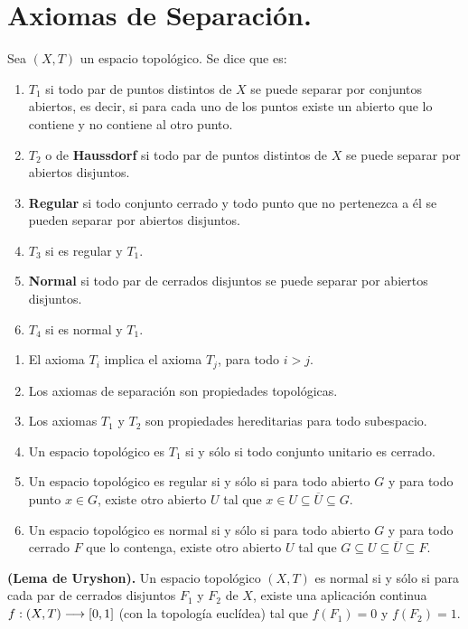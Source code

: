 \documentclass[cursovd_portada.tex]{subfiles}
\begin{document}
\section{Axiomas de Separación.}
\begin{defi}
Sea $(X,T)$ un espacio topológico. Se dice que es:
\begin{enumerate}
\item $T_1$ si todo par de puntos distintos de $X$ se puede separar por conjuntos abiertos, es decir, si para cada
uno de los puntos existe un abierto que lo contiene y no contiene al otro punto.
\item $T_2$ o de {\bf Haussdorf} si todo par de puntos distintos de $X$ se puede separar por abiertos disjuntos.
\item {\bf Regular} si todo conjunto cerrado y todo punto que no pertenezca a él se pueden separar por abiertos
disjuntos.
\item $T_3$ si es regular y $T_1$.
\item {\bf Normal} si todo par de cerrados disjuntos se puede separar por abiertos disjuntos.
\item $T_4$ si es normal y $T_1$.
\end{enumerate}
\end{defi}
\begin{prop}
\begin{enumerate}
\item El axioma $T_i$ implica el axioma $T_j$, para todo $i>j$.
\item Los axiomas de separación son propiedades topológicas.
\item Los axiomas $T_1$ y $T_2$ son propiedades hereditarias para todo subespacio.
\item Un espacio topológico es $T_1$ si y sólo si todo conjunto unitario es cerrado.
\item Un espacio topológico es regular si y sólo si para todo abierto $G$ y para todo punto $x\in G$,
existe otro abierto $U$ tal que $x\in U\subseteq\overline{U}\subseteq G$.
\item Un espacio topológico es normal si y sólo si para todo abierto $G$ y para todo cerrado $F$ que lo contenga,
existe otro abierto $U$ tal que $G\subseteq U\subseteq\overline{U}\subseteq F$.
\end{enumerate}
\end{prop}
\begin{teorema}
{\bf (Lema de Uryshon).} Un espacio topológico $(X,T)$ es normal si y sólo si para cada par de cerrados disjuntos
$F_1$ y $F_2$ de $X$, existe una aplicación continua $f:(X,T)\longrightarrow [0,1]$ (con la topología euclídea) tal que
$f(F_1)=0$ y $f(F_2)=1$.
\end{teorema}
\end{document}
